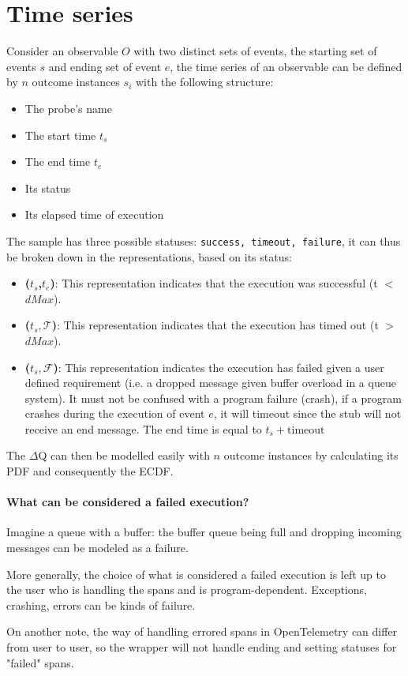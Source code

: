 \section{Time series}
    Consider an observable $O$ with two distinct sets of events, the starting set of events $s$ and ending set of event $e$, the time series of an observable can be defined by $n$ outcome instances $s_i$ with the following structure:
    \begin{itemize}
        \item The probe's name
        \item The start time $t_s$
        \item The end time $t_e$
        \item Its status 
        \item Its elapsed time of execution
    \end{itemize}
    The sample has three possible statuses: \texttt{success, timeout, failure}, it can thus be broken down in the representations, based on its status:
    \begin{itemize}
        \item \textbf{($t_s$,$t_e$)}: This representation indicates that the execution was successful (t $<$ $dMax$). 
        \item \textbf{($t_s, \mathcal{T}$)}: This representation indicates that the execution has timed out (t $>$ $dMax$). 
        \item \textbf{($t_s, \mathcal{F}$)}: This representation indicates the execution has failed given a user defined requirement (i.e. a dropped message given buffer overload in a queue system). It must not be confused with a program failure (crash), if a program crashes during the execution of event $e$, it will timeout since the stub will not receive an end message. The end time is equal to $t_s + \text{timeout}$ 
    \end{itemize}
    The $\Delta$Q can then be modelled easily with $n$ outcome instances by calculating its PDF and consequently the ECDF.

    \paragraph{What can be considered a failed execution?} Imagine a queue with a buffer: the buffer queue being full and dropping incoming messages can be modeled as a failure.

    More generally, the choice of what is considered a failed execution is left up to the user who is handling the spans and is program-dependent. Exceptions, crashing, errors can be kinds of failure. 

    On another note, the way of handling errored spans in OpenTelemetry can differ from user to user, so the wrapper will not handle ending and setting statuses for "failed" spans.
   
